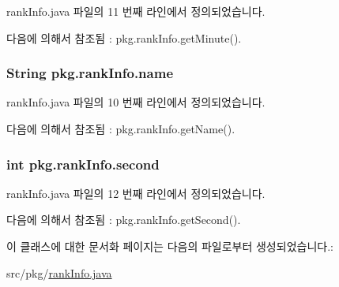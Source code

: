 rank\+Info.\+java 파일의 11 번째 라인에서 정의되었습니다.



다음에 의해서 참조됨 \+:  pkg.\+rank\+Info.\+get\+Minute().

\subsubsection[{\texorpdfstring{name}{name}}]{\setlength{\rightskip}{0pt plus 5cm}String pkg.\+rank\+Info.\+name\hspace{0.3cm}{\ttfamily [private]}}\hypertarget{classpkg_1_1rank_info_a9827a3e66334934e04ad16c3d6c9954f}{}\label{classpkg_1_1rank_info_a9827a3e66334934e04ad16c3d6c9954f}


rank\+Info.\+java 파일의 10 번째 라인에서 정의되었습니다.



다음에 의해서 참조됨 \+:  pkg.\+rank\+Info.\+get\+Name().

\subsubsection[{\texorpdfstring{second}{second}}]{\setlength{\rightskip}{0pt plus 5cm}int pkg.\+rank\+Info.\+second\hspace{0.3cm}{\ttfamily [private]}}\hypertarget{classpkg_1_1rank_info_ac7779be368adc4404ae97f34bc2809aa}{}\label{classpkg_1_1rank_info_ac7779be368adc4404ae97f34bc2809aa}


rank\+Info.\+java 파일의 12 번째 라인에서 정의되었습니다.



다음에 의해서 참조됨 \+:  pkg.\+rank\+Info.\+get\+Second().



이 클래스에 대한 문서화 페이지는 다음의 파일로부터 생성되었습니다.\+:\begin{DoxyCompactItemize}
\item 
src/pkg/\hyperlink{rank_info_8java}{rank\+Info.\+java}\end{DoxyCompactItemize}
